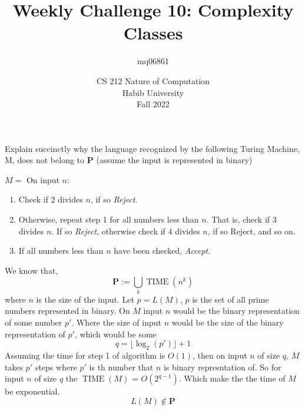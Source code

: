 \documentclass[a4paper]{exam}
\title{Weekly Challenge 10: Complexity Classes}
\author{mq06861} %
\date{CS 212 Nature of Computation\\Habib University\\Fall 2022}
\begin{document}
\maketitle

\begin{questions}
  

Explain succinctly why the language recognized by the following Turing Machine, M, does not belong to $\mathbf{P}$ (assume the input is represented in binary)

$M = $ On input $n$:
\begin{enumerate}
\item Check if 2 divides $n$, if so \textit{Reject}.
\item Otherwise, repeat step 1 for all numbers less than $n$. That is, check if 3 divides $n$. If so \textit{Reject}, otherwise check if 4 divides $n$, if so Reject, and so on.
\item If all numbers less than $n$ have been checked, \textit{Accept}.  
\end{enumerate}
	\begin{solution}
		We know that,
		\[
			\displaystyle\mathbf{P} := \bigcup_{k} \operatorname{TIME}(n^k)
		\]
		where \(n\) is the size of the input. Let \(p = L(M)\),
		\(p\) is the set of all prime numbers represented in binary.
		On \(M\) input \(n\) would be the binary representation of
		some number \(p'\). Where the size of input \(n\) would be the
		size of the binary representation of \(p'\), which would be some
		\[q = \lfloor\log_2(p')\rfloor+1\]
		Assuming the time for step 1 of algorithm is \(O(1)\), then on
		input \(n\) of size \(q\), \(M\) takes \(p'\) steps where \(p'\)
		is th number that \(n\) is binary represntation of. So for
		input \(n\) of size \(q\) the \(\operatorname{TIME}(M)\) = \(O(2^{q-1})\).
		Which make the the time of \(M\) be exponential.
		\[L(M)\notin\mathbf{P}\]
  	\end{solution}
\end{questions}
\end{document}
